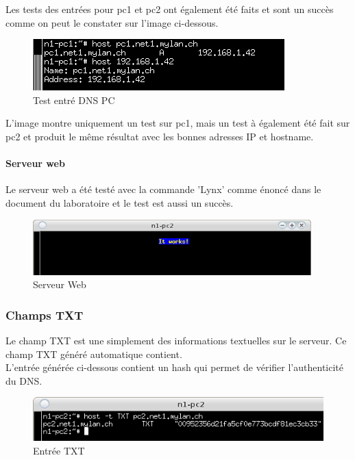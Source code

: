 \documentclass{article}
\begin{document}
Les tests des entrées pour pc1 et pc2 ont également été faits et sont un succès comme on peut le constater sur l'image ci-dessous.

\begin{figure}[h]
	\centering
	\includegraphics{./captures/2-test-dns-pc1.png}
	\caption{Test entré DNS PC}
	\label{fig:Test entrées DNS pc}
\end{figure}

L'image montre uniquement un test sur pc1, mais un test à également été fait sur pc2 et produit le même résultat avec les bonnes adresses IP et hostname.

\paragraph{Serveur web}

Le serveur web a été testé avec la commande 'Lynx' comme énoncé dans le document du laboratoire et le test est aussi un succès. \cite{doc-labo}

\begin{figure}[h]
	\centering
	\includegraphics{./captures/ItWorks-www.png}
	\caption{Serveur Web}
	\label{fig:Serveur Web}
\end{figure}

\subsubsection{Champs TXT}

Le champ TXT est une simplement des informations textuelles sur le serveur. Ce champ TXT généré automatique contient. \cite{TXT}\\

L'entrée générée ci-dessous contient un hash qui permet de vérifier l'authenticité du DNS.

\begin{figure}[h]
	\centering
	\includegraphics{./captures/txt-entry.png}
	\caption{Entrée TXT}
	\label{fig:Entrée TXT}
\end{figure}
\end{document}
